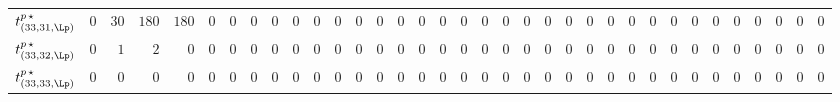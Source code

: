 \begin{tabular}{r|rrrrrrrrrrrrrrrrrrrrrrrrrrrrrrrrrr}
  $t^{p \, \star}_{(33,31,\Lp)}$ & $0$ & $30$ & $180$ & $180$ & $0$ & $0$ & $0$ & $0$ & $0$ & $0$ & $0$ & $0$ & $0$ & $0$ & $0$ & $0$ & $0$ & $0$ & $0$ & $0$ & $0$ & $0$ & $0$ & $0$ & $0$ & $0$ & $0$ & $0$ & $0$ & $0$ & $0$ & $0$ & $0$ & $0$ \\
  $t^{p \, \star}_{(33,32,\Lp)}$ & $0$ & $1$ & $2$ & $0$ & $0$ & $0$ & $0$ & $0$ & $0$ & $0$ & $0$ & $0$ & $0$ & $0$ & $0$ & $0$ & $0$ & $0$ & $0$ & $0$ & $0$ & $0$ & $0$ & $0$ & $0$ & $0$ & $0$ & $0$ & $0$ & $0$ & $0$ & $0$ & $0$ & $0$ \\
  $t^{p \, \star}_{(33,33,\Lp)}$ & $0$ & $0$ & $0$ & $0$ & $0$ & $0$ & $0$ & $0$ & $0$ & $0$ & $0$ & $0$ & $0$ & $0$ & $0$ & $0$ & $0$ & $0$ & $0$ & $0$ & $0$ & $0$ & $0$ & $0$ & $0$ & $0$ & $0$ & $0$ & $0$ & $0$ & $0$ & $0$ & $0$ & $0$ \\
\end{tabular}
